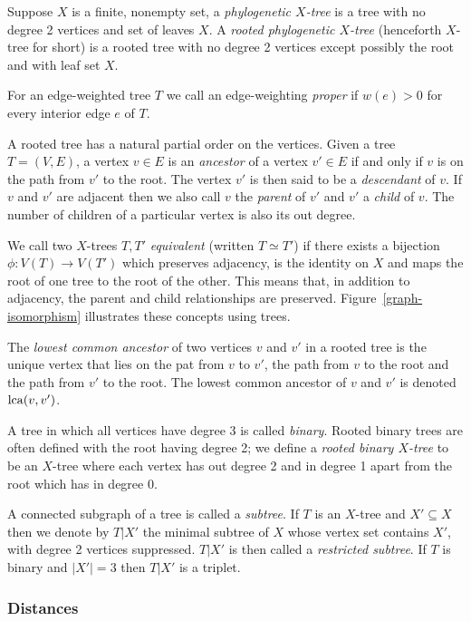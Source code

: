 Suppose $X$ is a finite, nonempty set, a \textit{phylogenetic $X$-tree} is a
tree with no degree 2 vertices and set of leaves $X$.  A \textit{rooted
  phylogenetic $X$-tree} (henceforth $X$-tree for short) is a rooted tree with
no degree 2 vertices except possibly the root and with leaf set $X$.

For an edge-weighted tree
$T$ we call an edge-weighting \textit{proper} if $w(e) > 0$ for every interior
edge $e$ of $T$.

A rooted tree has a natural partial order on the vertices.  Given a tree
$T=(V,E)$, a vertex $v \in E$ is an \textit{ancestor} of a vertex $v' \in E$
if and only if $v$ is on the path from $v'$ to the root.  The vertex $v'$ is
then said to be a \textit{descendant} of $v$.  If $v$ and $v'$ are adjacent
then we also call $v$ the \textit{parent} of $v'$ and $v'$ a \textit{child} of
$v$.  The number of children of a particular vertex is also its out degree.

We call two $X$-trees $T,T'$ \textit{equivalent} (written $T \simeq T'$) if
there exists a bijection $\phi \colon V(T) \to V(T')$ which preserves
adjacency, is the identity on $X$ and maps the root of one tree to the root of
the other.  This means that, in addition to adjacency, the parent and child
relationships are preserved.  Figure~\ref{graph-isomorphism} illustrates these
concepts using trees.

The \textit{lowest common ancestor} of two vertices $v$ and $v'$ in a rooted
tree is the unique vertex that lies on the pat from $v$ to $v'$, the path from
$v$ to the root and the path from $v'$ to the root.  The lowest common
ancestor of $v$ and $v'$ is denoted $\operatorname{lca}(v,v')$.

A tree in which all vertices have degree 3 is called \textit{binary}.  Rooted
binary trees are often defined with the root having degree 2; we define a
\textit{rooted binary $X$-tree} to be an $X$-tree where each vertex has out
degree 2 and in degree 1 apart from the root which has in degree 0.

A connected subgraph of a tree is called a \textit{subtree}.  If $T$ is an
$X$-tree and $X' \subseteq X$ then we denote by $T|X'$ the minimal subtree of
$X$ whose vertex set contains $X'$, with degree 2 vertices suppressed.  $T|X'$
is then called a \textit{restricted subtree}.  If $T$ is binary and $|X'| = 3$
then $T|X'$ is a triplet.

\subsubsection{Distances}
\label{sec:distances}

